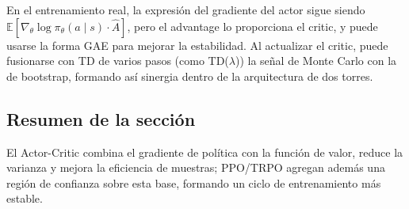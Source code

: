 En el entrenamiento real, la expresión del gradiente del actor sigue siendo $\mathbb{E}[\nabla_\theta \log \pi_\theta(a\mid s) \cdot \hat{A}]$, pero el advantage lo proporciona el critic, y puede usarse la forma GAE para mejorar la estabilidad. Al actualizar el critic, puede fusionarse con TD de varios pasos (como TD($\lambda$)) la señal de Monte Carlo con la de bootstrap, formando así sinergia dentro de la arquitectura de dos torres.

\subsection{Resumen de la sección}
El Actor-Critic combina el gradiente de política con la función de valor, reduce la varianza y mejora la eficiencia de muestras; PPO/TRPO agregan además una región de confianza sobre esta base, formando un ciclo de entrenamiento más estable.

